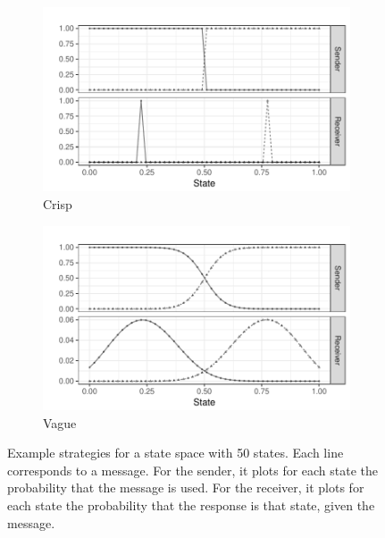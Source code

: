 \documentclass[a4paper]{article}
\begin{document}
\begin{figure}
  \centering

  \begin{subfigure}[]{0.45\textwidth}
    \includegraphics[width=\textwidth]{Rplot-example-strict.pdf}
    \caption{Crisp}
    \label{fig:example_stratsA}
  \end{subfigure}
  \hfill
  \begin{subfigure}[]{0.45\textwidth}
    \includegraphics[width=\textwidth]{Rplot-example-vague.pdf}
    \caption{Vague}
    \label{fig:example_stratsB}
  \end{subfigure}

  \caption{Example strategies for a state space with 50 states. Each line corresponds to a message. For the sender, it plots for each state the probability that the message is used. For the receiver, it plots for each state the probability that the response is that state, given the message.}
  \label{fig:example_strats}
\end{figure}
\end{document}

